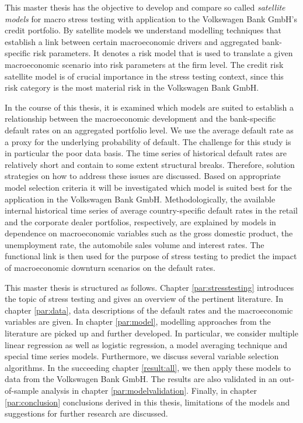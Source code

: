 \documentclass[a4paper, 11pt]{scrreprt}
\begin{document}
This master thesis has the objective to develop and compare so called \textit{satellite models} \linebreak for macro stress testing with application to the Volkswagen Bank GmbH's credit portfolio. By satellite models we understand modelling techniques that establish a link between certain macroeconomic drivers and aggregated bank-specific risk parameters. It denotes a risk model that is used to translate a given macroeconomic scenario into risk parameters at the firm level.
The credit risk satellite model is of crucial importance in the stress testing context, since this risk category is the most material risk in the Volkswagen Bank GmbH.

\bigskip

In the course of this thesis, it is examined which models are suited to establish a relationship between the macroeconomic development and the bank-specific default rates on an aggregated portfolio level. We use the average default rate as a proxy for the underlying probability of default.
The challenge for this study is in particular the poor data basis. The time series of historical default rates are relatively short and contain to some extent structural breaks. Therefore, solution strategies on how to address these issues are discussed. Based on appropriate model selection criteria it will be investigated which model is suited best for the application in the Volkswagen Bank GmbH.
Methodologically, the available internal historical time series of average country-specific default rates in the retail and the corporate dealer portfolios, respectively, are explained by models in dependence on macroeconomic variables such as the gross domestic product, the unemployment rate, the automobile sales volume and interest rates.
The functional link is then used for the purpose of stress testing to predict the impact of macroeconomic downturn scenarios on the default rates. 

\pagebreak

This master thesis is structured as follows. Chapter \ref{par:stresstesting} introduces the topic of stress testing and gives an overview of the pertinent literature. In chapter \ref{par:data}, data descriptions of the default rates and the macroeconomic variables are given. In chapter \ref{par:model}, modelling approaches from the literature  are picked up and further developed. In particular, we consider multiple linear regression as well as logistic regression, a model averaging technique and special time series models. Furthermore, we discuss several variable selection algorithms.
In the succeeding chapter \ref{result:all}, we then apply these models to data from the Volkswagen Bank GmbH. 
The results are also validated in an out-of-sample analysis in chapter \ref{par:modelvalidation}. Finally, in chapter \ref{par:conclusion} conclusions derived in this thesis, limitations of the models and suggestions for further research are discussed. 
\end{document}
